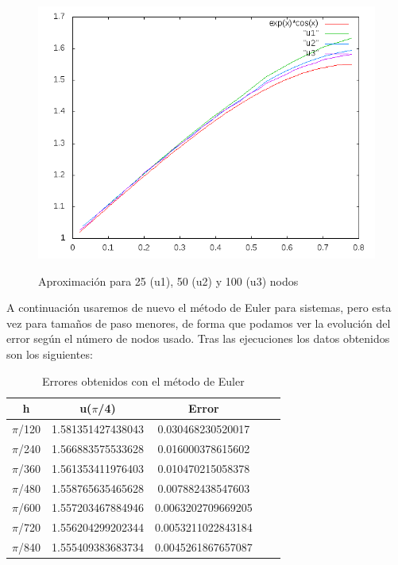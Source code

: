 \documentclass[12pt]{article}       %
\begin{document}
\begin{figure}[H]
\centering
\includegraphics[scale=0.65]{img/graphic.png}
\label{figura1}
\caption{Aproximación para 25 (u1), 50 (u2) y 100 (u3) nodos} 
\end{figure}

A continuación usaremos de nuevo el método de Euler para sistemas, pero esta vez para tamaños de paso menores, de forma que podamos ver la evolución del error según el número de nodos usado. Tras las ejecuciones los datos obtenidos son los siguientes:

    \begin{table}[H]
        \centering
        \setlength\extrarowheight{3pt}
        
        \begin{tabular}{|c|c|c|c|c}
            \hline
            \textbf{h} & {\textbf{u($\pi$/4)}} & \textbf{Error} \\ 
            \hline
                $\pi$/120 & 1.581351427438043 & 0.030468230520017\\
            \hline
                $\pi$/240 & 1.566883575533628 & 0.016000378615602\\
            \hline
                $\pi$/360 & 1.561353411976403 & 0.010470215058378\\
            \hline
                $\pi$/480 & 1.558765635465628 & 0.007882438547603\\
            \hline
                $\pi$/600 & 1.557203467884946 & 0.0063202709669205\\
            \hline
                $\pi$/720 &  1.556204299202344 & 0.0053211022843184\\
            \hline
                $\pi$/840 & 1.555409383683734 & 0.0045261867657087\\
            \hline
        \end{tabular}
        
        \caption{Errores obtenidos con el método de Euler}           
    \end{table}
\end{document}
